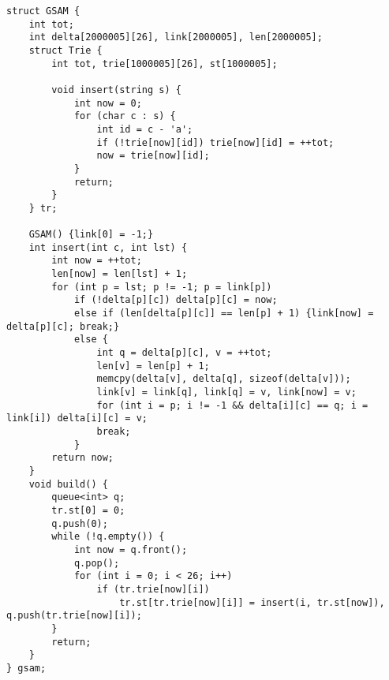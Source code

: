 \begin{verbatim}
struct GSAM {
    int tot;
    int delta[2000005][26], link[2000005], len[2000005];
    struct Trie {
        int tot, trie[1000005][26], st[1000005];

        void insert(string s) {
            int now = 0;
            for (char c : s) {
                int id = c - 'a';
                if (!trie[now][id]) trie[now][id] = ++tot;
                now = trie[now][id];
            }
            return;
        }
    } tr;

    GSAM() {link[0] = -1;}
    int insert(int c, int lst) {
        int now = ++tot;
        len[now] = len[lst] + 1;
        for (int p = lst; p != -1; p = link[p])
            if (!delta[p][c]) delta[p][c] = now;
            else if (len[delta[p][c]] == len[p] + 1) {link[now] = delta[p][c]; break;}
            else {
                int q = delta[p][c], v = ++tot;
                len[v] = len[p] + 1;
                memcpy(delta[v], delta[q], sizeof(delta[v]));
                link[v] = link[q], link[q] = v, link[now] = v;
                for (int i = p; i != -1 && delta[i][c] == q; i = link[i]) delta[i][c] = v;
                break;
            }
        return now;
    }
    void build() {
        queue<int> q;
        tr.st[0] = 0;
        q.push(0);
        while (!q.empty()) {
            int now = q.front();
            q.pop();
            for (int i = 0; i < 26; i++)
                if (tr.trie[now][i])
                    tr.st[tr.trie[now][i]] = insert(i, tr.st[now]), q.push(tr.trie[now][i]);
        }
        return;
    }
} gsam;
\end{verbatim}